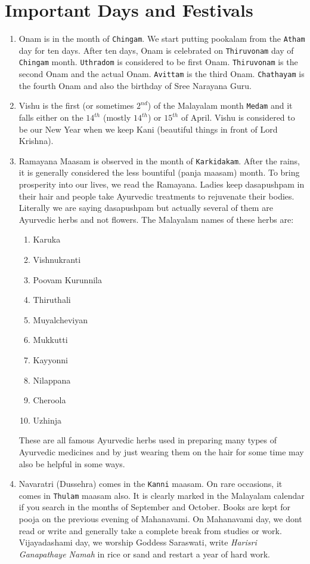 \documentclass[10pt,twoside]{article}
\begin{document}
\section{Important Days and Festivals}
\begin{enumerate}
\item Onam is in the month of \verb|Chingam|. We start putting pookalam from the \verb|Atham| day for ten days. After ten days, Onam is celebrated on \verb|Thiruvonam| day of \verb|Chingam| month. \verb|Uthradom| is considered to be first Onam. \verb|Thiruvonam| is the second Onam and the actual Onam. \verb|Avittam| is the third Onam. \verb|Chathayam| is the fourth Onam and also the birthday of Sree Narayana Guru.
\item Vishu is the first (or sometimes $2^{nd}$) of the Malayalam month \verb|Medam| and it falls either on the $14^{th}$ (mostly $14^{th}$) or $15^{th}$ of April. Vishu is considered to be our New Year when we keep Kani (beautiful things in front of Lord Krishna).
\item Ramayana Maasam is observed in the month of \verb|Karkidakam|. After the rains, it is generally considered the less bountiful (panja maasam) month. To bring prosperity into our lives, we read the Ramayana. Ladies keep dasapushpam in their hair and people take Ayurvedic treatments to rejuvenate their bodies. Literally we are saying dasapushpam but actually several of them are Ayurvedic herbs and not flowers. The Malayalam names of these herbs are:
\begin{enumerate}
\item Karuka 
\item Vishnukranti
\item Poovam Kurunnila
\item Thiruthali
\item Muyalcheviyan
\item Mukkutti
\item Kayyonni
\item Nilappana
\item Cheroola
\item Uzhinja
\end{enumerate} 
These are all famous Ayurvedic herbs used in preparing many types of Ayurvedic medicines and by just wearing them on the hair for some time may also be helpful in some ways.
\item Navaratri (Dussehra) comes in the \verb|Kanni| maasam. On rare occasions, it comes in \verb|Thulam| maasam also. It is clearly marked in the Malayalam calendar if you search in the months of September and October. Books are kept for pooja on the previous evening of Mahanavami. On Mahanavami day,  we dont read or write and generally take a complete break from studies or work. Vijayadashami day, we worship Goddess Saraswati, write \emph{Harisri Ganapathaye Namah} in rice or sand and restart a year of hard work.

\end{enumerate}
\end{document}
